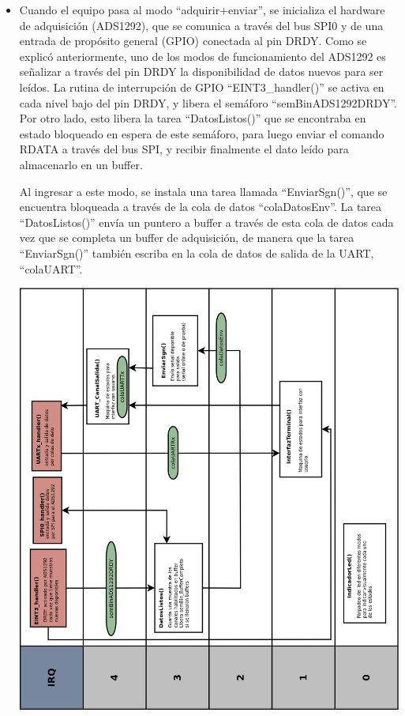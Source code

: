 \begin{itemize}
	\item Cuando el equipo pasa al modo “adquirir+enviar”, se inicializa el hardware de adquisición (ADS1292), que se comunica a través del bus SPI0 y de una entrada de propósito general (GPIO) conectada al pin DRDY. Como se explicó anteriormente, uno de los modos de funcionamiento del ADS1292 es señalizar a través del pin DRDY la disponibilidad de datos nuevos para ser leídos. La rutina de interrupción de GPIO “EINT3\_handler()” se activa en cada nivel bajo del pin DRDY, y libera el semáforo “semBinADS1292DRDY”. Por otro lado, esto libera la tarea “DatosListos()” que se encontraba en estado bloqueado en espera de este semáforo, para luego enviar el comando RDATA a través del bus SPI, y recibir finalmente el dato leído para almacenarlo en un buffer. 

		Al ingresar a este modo, se instala una tarea llamada “EnviarSgn()”, que se encuentra bloqueada a través de la cola de datos “colaDatosEnv”. La tarea “DatosListos()” envía un puntero a buffer a través de esta cola de datos cada vez que se completa un buffer de adquisición, de manera que la tarea “EnviarSgn()” también escriba en la cola de datos de salida de la UART, “colaUART”.
		
\begin{adjustbox}{center,caption={Diagrama de tareas en modo adquirir y enviar},label={fig:VOP24_tareas_v1_adquirirEnviar},nofloat=figure,vspace=\bigskipamount}
\includegraphics[scale = 0.23]{./Figures/VOP24_tareas_v1_adquirirEnviar.png}
\end{adjustbox}		
		

\end{itemize}
